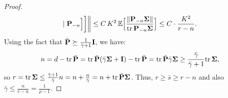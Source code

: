 \documentclass[11pt]{article}
\begin{document}
\begin{proof}
\begin{align*}
  \mid \mathbf P_{-n}\Big]\bigg]\bigg\|  \leq
C\,K^2\,\mathbb E\Big[\frac{\|\mathbf P_{-n}\mathbf{\Sigma}\|}{\mathrm{tr}\,\mathbf P_{-n}\mathbf{\Sigma}}\Big]   
\leq C\cdot \frac{K^2}{r-n}.
\end{align*}
Using the fact that $\bar{\mathbf P}\succeq \frac1{\bar\gamma+1}\mathbf I$,
we have:
\begin{align*}
n = d - \mathrm{tr}\,\bar{\mathbf P} = \mathrm{tr}\,\bar{\mathbf P} (\bar\gamma\mathbf{\Sigma} + \mathbf I) - \mathrm{tr}\,\bar{\mathbf P}
  = \mathrm{tr}\,\bar{\mathbf P} \bar\gamma\mathbf{\Sigma}\geq \frac{\bar\gamma}{\bar\gamma+1}\mathrm{tr}\,\mathbf{\Sigma},
\end{align*}
so $r=\mathrm{tr}\,\mathbf{\Sigma}\leq \frac{\bar\gamma+1}{\bar\gamma}n=n + \frac
n{\bar\gamma}=n+\mathrm{tr}\,\bar{\mathbf P}\mathbf{\Sigma}$. Thus, $r\geq\bar s \geq r-n$ and also $\bar\gamma\leq
\frac{n}{r-n}=\frac1{\rho-1}$.

\end{proof}
\end{document}
